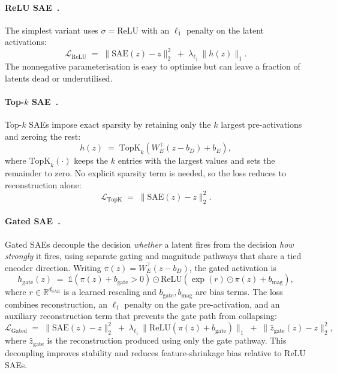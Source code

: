 \paragraph{ReLU SAE~\citep{cunningham2024sparse}.}
The simplest variant uses $\sigma = \mathrm{ReLU}$ with an $\ell_1$
penalty on the latent activations:
\begin{equation}
\mathcal{L}_{\mathrm{ReLU}}
\;=\;
\|\mathrm{SAE}(z) - z\|_2^2
\;+\;
\lambda_{\ell_1}\,\|h(z)\|_1.
\label{eq:relu-sae}
\end{equation}
The nonnegative parameterisation is easy to optimise but can leave a
fraction of latents dead or underutilised.

\paragraph{Top-$k$ SAE~\citep{gao2025scaling}.}
Top-$k$ SAEs impose exact sparsity by retaining only the $k$ largest
pre-activations and zeroing the rest:
\begin{equation}
h(z) \;=\; \mathrm{TopK}_{k}\!\left(W_E^{\top}(z - b_D) + b_E\right),
\label{eq:topk-sae}
\end{equation}
where $\mathrm{TopK}_{k}(\cdot)$ keeps the $k$ entries with the largest
values and sets the remainder to zero. No explicit sparsity term is
needed, so the loss reduces to reconstruction alone:
\begin{equation}
\mathcal{L}_{\mathrm{TopK}} \;=\; \|\mathrm{SAE}(z) - z\|_2^2.
\label{eq:topk-loss}
\end{equation}

\paragraph{Gated SAE~\citep{rajamanoharan2024improving}.}
Gated SAEs decouple the decision \emph{whether} a latent fires from the
decision \emph{how strongly} it fires, using separate gating and
magnitude pathways that share a tied encoder direction. Writing
$\pi(z) = W_E^{\top}(z - b_D)$, the gated activation is
\begin{equation}
h_{\mathrm{gate}}(z)
\;=\;
\mathbb{1}\!\left(\pi(z) + b_{\mathrm{gate}} > 0\right)
\odot
\mathrm{ReLU}\!\left(\exp(r)\odot\pi(z) + b_{\mathrm{mag}}\right),
\label{eq:gated-sae}
\end{equation}
where $r \in \mathbb{R}^{d_{\mathrm{SAE}}}$ is a learned rescaling and
$b_{\mathrm{gate}}, b_{\mathrm{mag}}$ are bias terms. The loss combines
reconstruction, an $\ell_1$ penalty on the gate pre-activation, and an
auxiliary reconstruction term that prevents the gate path from collapsing:
\begin{equation}
\mathcal{L}_{\mathrm{Gated}}
\;=\;
\|\mathrm{SAE}(z) - z\|_2^2
\;+\;
\lambda_{\ell_1}\,\|\mathrm{ReLU}(\pi(z) + b_{\mathrm{gate}})\|_1
\;+\;
\|\hat{z}_{\mathrm{gate}}(z) - z\|_2^2,
\label{eq:gated-loss}
\end{equation}
where $\hat{z}_{\mathrm{gate}}$ is the reconstruction produced using only
the gate pathway. This decoupling improves stability and reduces
feature-shrinkage bias relative to ReLU SAEs.

